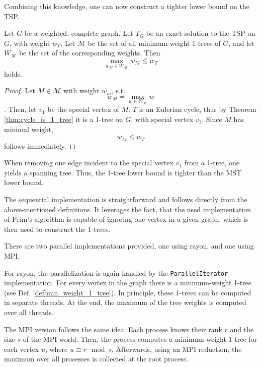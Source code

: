 Combining this knowledge, one can now construct a tighter lower bound on the \ac{TSP}.
\begin{theorem}
  Let $G$ be a weighted, complete graph. Let $T_G$ be an exact solution to the \ac{TSP} on $G$,
  with weight $w_T$.
  Let $\mathcal{M}$ be the set of all minimum-weight 1-trees of $G$,
  and let $W_\mathcal{M}$ be the set of the corresponding weights.
  Then $$\max_{w_M \in W_\mathcal{M}}w_M \leq w_T$$ holds.
  \label{thm:1_tree_lower_bound}
\end{theorem}
\begin{proof}
  Let $M \in \mathcal{M}$ with weight $w_m$, s.t. $$w_M = \max_{w \in W_\mathcal{M}}w$$.
  Then, let $v_1$ be the special vertex of $M$.
  $T$ is an Eulerian cycle, thus by Theorem \ref{thm:cycle_is_1_tree} it is a 1-tree on $G$,
  with special vertex $v_1$.
  Since $M$ has minimal weight, $$w_M \leq w_T$$ follows immediately.
\end{proof}
\begin{remark}
  When removing one edge incident to the special vertex $v_1$ from a 1-tree, one yields a spanning tree.
  Thus, the 1-tree lower bound is tighter than the \ac{MST} lower bound.
\end{remark}

The sequential implementation is straightforward and
follows directly from the above-mentioned definitions.
It leverages the fact, that the used implementation of Prim's algorithm
is capable of ignoring one vertex in a given graph,
which is then used to construct the 1-trees.

There are two parallel implementations provided, one using rayon, and one using \ac{MPI}.

For rayon, the parallelization is again handled by the \texttt{ParallelIterator} implementation.
For every vertex in the graph there is a minimum-weight 1-tree (see Def. \ref{def:min_weight_1_tree}).
In principle, these 1-trees can be computed in separate threads. At the end, the maximum of the
tree weights is computed over all threads.

The \ac{MPI} version follows the same idea. Each process knows their rank $r$ and the size $s$ of the \ac{MPI} world.
Then, the process computes a minimum-weight 1-tree for each vertex $u$,
where $u \equiv r \mod s$.
Afterwards, using an \ac{MPI} reduction, the maximum over all processes is collected at the root process.
